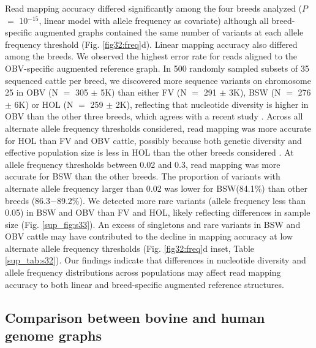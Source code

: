 \documentclass[../main.tex]{subfiles}
\begin{document}
Read mapping accuracy differed significantly among the four breeds analyzed ($P$ $=$ 10$^{-15}$, linear model with allele frequency as covariate) although all breed-specific augmented graphs contained the same number of variants at each allele frequency threshold (Fig. \ref{fig32:freq}d). Linear mapping accuracy also differed among the breeds. We observed the highest error rate for reads aligned to the OBV-specific augmented reference graph. In 500 randomly sampled subsets of 35 sequenced cattle per breed, we discovered more sequence variants on chromosome 25 in OBV (N $=$ 305 $\pm$ 5K) than either FV (N $=$ 291 $\pm$ 3K), BSW (N $=$ 276 $\pm$ 6K) or HOL (N $=$ 259 $\pm$ 2K), reflecting that nucleotide diversity is higher in OBV than the other three breeds, which agrees with a recent study \citep{bhati2020assessing}. Across all alternate allele frequency thresholds considered, read mapping was more accurate for HOL than FV and OBV cattle, possibly because both genetic diversity and effective population size is less in HOL than the other breeds considered \citep{signer2017population}. At allele frequency thresholds between 0.02 and 0.3, read mapping was more accurate for BSW than the other breeds. The proportion of variants with alternate allele frequency larger than 0.02 was lower for BSW(84.1\%) than other breeds (86.3$-$89.2\%). We detected more rare variants (allele frequency less than 0.05) in BSW and OBV than FV and HOL, likely reflecting differences in sample size (Fig. \ref{sup_fig:s33}). An excess of singletons and rare variants in BSW and OBV cattle may have contributed to the decline in mapping accuracy at low alternate allele frequency thresholds (Fig. \ref{fig32:freq}d inset, Table \ref{sup_tab:s32}). Our findings indicate that differences in nucleotide diversity and allele frequency distributions across populations may affect read mapping accuracy to both linear and breed-specific augmented reference structures.

\subsection*{Comparison between bovine and human genome graphs}
\end{document}
